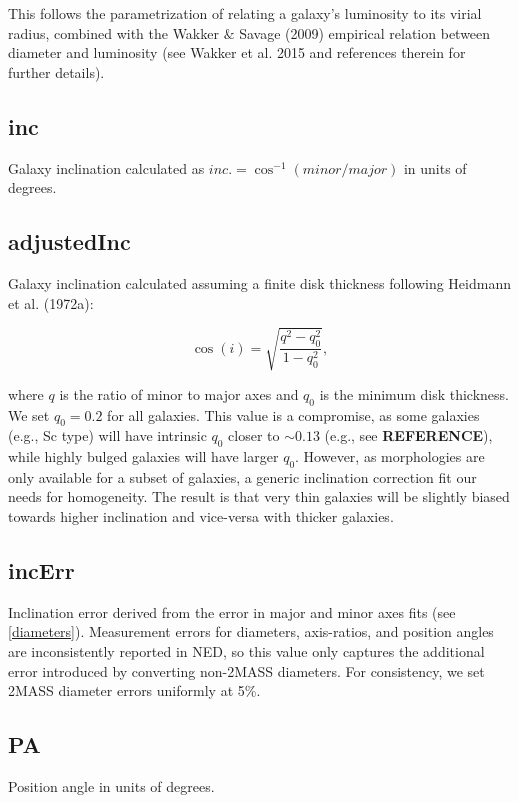 \documentclass[iop]{emulateapj-rtx4}
\begin{document}
This follows the parametrization of \cite{stocke2013} relating a galaxy's luminosity to its virial radius, combined with the Wakker $\&$ Savage (2009) empirical relation between diameter and luminosity (see Wakker et al. 2015 and references therein for further details).

\subsection{inc}
Galaxy inclination calculated as $inc. = \cos^{-1} (minor / major)$ in units of degrees.

\subsection{adjustedInc}
Galaxy inclination calculated assuming a finite disk thickness following Heidmann et al. (1972a):

\begin{equation}
	\cos(i) = \sqrt{\frac{q^2 - q_0^2}{1 - q_0^2}},
	\label{incEq}
\end{equation}

where $q$ is the ratio of minor to major axes and $q_0$ is the minimum disk thickness. We set $q_0 = 0.2$ for all galaxies. This value is a compromise, as some galaxies (e.g., Sc type) will have intrinsic $q_0$ closer to $\sim 0.13$ (e.g., see \textbf{REFERENCE}), while highly bulged galaxies will have larger $q_0$. However, as morphologies are only available for a subset of galaxies, a generic inclination correction fit our needs for homogeneity. The result is that very thin galaxies will be slightly biased towards higher inclination and vice-versa with thicker galaxies.

\subsection{incErr}
Inclination error derived from the error in major and minor axes fits (see \ref{diameters}). Measurement errors for diameters, axis-ratios, and position angles are inconsistently reported in NED, so this value only captures the additional error introduced by converting non-2MASS diameters. For consistency, we set 2MASS diameter errors uniformly at 5\%.

\subsection{PA}
Position angle in units of degrees.
\end{document}
